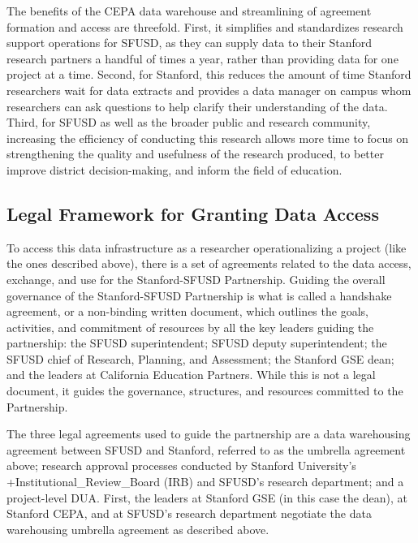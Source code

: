 \documentclass[
]{book}
\begin{document}
The benefits of the CEPA data warehouse and streamlining of agreement formation and access are threefold. First, it simplifies and standardizes research support operations for SFUSD, as they can supply data to their Stanford research partners a handful of times a year, rather than providing data for one project at a time. Second, for Stanford, this reduces the amount of time Stanford researchers wait for data extracts and provides a data manager on campus whom researchers can ask questions to help clarify their understanding of the data. Third, for SFUSD as well as the broader public and research community, increasing the efficiency of conducting this research allows more time to focus on strengthening the quality and usefulness of the research produced, to better improve district decision-making, and inform the field of education.

\hypertarget{legal-framework-for-granting-data-access-5}{%
\subsection{Legal Framework for Granting Data Access}\label{legal-framework-for-granting-data-access-5}}

To access this data infrastructure as a researcher operationalizing a project (like the ones described above), there is a set of agreements related to the data access, exchange, and use for the Stanford-SFUSD Partnership. Guiding the overall governance of the Stanford-SFUSD Partnership is what is called a handshake agreement, or a non-binding written document, which outlines the goals, activities, and commitment of resources by all the key leaders guiding the partnership: the SFUSD superintendent; SFUSD deputy superintendent; the SFUSD chief of Research, Planning, and Assessment; the Stanford GSE dean; and the leaders at California Education Partners. While this is not a legal document, it guides the governance, structures, and resources committed to the Partnership.

The three legal agreements used to guide the partnership are a data warehousing agreement between SFUSD and Stanford, referred to as the umbrella agreement above; research approval processes conducted by Stanford University's +Institutional\_Review\_Board\textbar{} (IRB) and SFUSD's research department; and a project-level DUA. First, the leaders at Stanford GSE (in this case the dean), at Stanford CEPA, and at SFUSD's research department negotiate the data warehousing umbrella agreement as described above.
\end{document}
